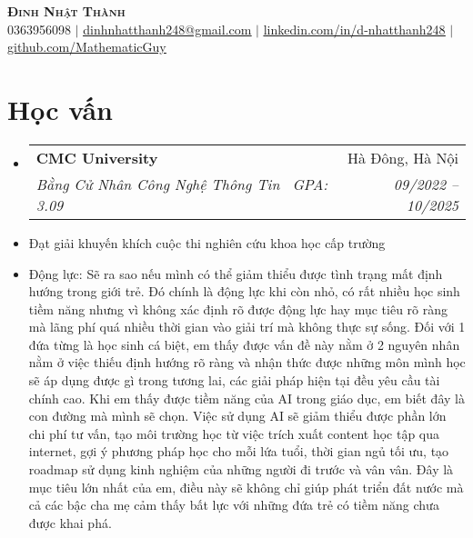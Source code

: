 \documentclass[letterpaper,11pt]{article}
\makeatletter
\newcommand{\resumeItem}[1]{
	\item\small{
	{#1 \vspace{-2pt}}
	}
}
\newcommand{\resumeSubheading}[4]{
	\vspace{-2pt}\item
	\begin{tabular*}{0.97\textwidth}[t]{l@{\extracolsep{\fill}}r}
		\textbf{#1} & #2 \\
		\textit{\small#3} & \textit{\small #4} \\
	\end{tabular*}\vspace{-7pt}
}
\newcommand{\resumeSubHeadingListStart}{\begin{itemize}[leftmargin=0.15in, label={}]}
\newcommand{\resumeSubHeadingListEnd}{\end{itemize}}
\makeatother
\begin{document}

\begin{center}
    \textbf{\Huge \scshape Đinh Nhật Thành} \\ \vspace{1pt}
    \small 0363956098 $|$ \href{mailto:x@x.com}{\underline{dinhnhatthanh248@gmail.com}} $|$
    \href{https://linkedin.com/in/...}{\underline{linkedin.com/in/d-nhatthanh248}} $|$
    \href{https://github.com/...}{\underline{github.com/MathematicGuy}}
\end{center}


\section{Học vấn}
	\resumeSubHeadingListStart
	\resumeSubheading
		{CMC University} {Hà Đông, Hà Nội}
		{Bằng Cử Nhân Công Nghệ Thông Tin \textbar \ GPA: 3.09}{09/2022 -- 10/2025}
		\resumeItem{Đạt giải khuyến khích cuộc thi nghiên cứu khoa học cấp trường}
		\resumeItem{Động lực: 	Sẽ ra sao nếu mình có thể giảm thiểu được tình trạng mất định hướng trong giới trẻ. Đó chính là động lực khi còn nhỏ, có rất nhiều học sinh tiềm năng nhưng vì không xác định rõ được động lực hay mục tiêu rõ ràng mà lãng phí quá nhiều thời gian vào giải trí mà không thực sự sống. Đối với 1 đứa từng là học sinh cá biệt, em thấy được vấn đề này nằm ở 2 nguyên nhân nằm ở việc thiếu định hướng rõ ràng và nhận thức được những môn mình học sẽ áp dụng được gì trong tương lai, các giải pháp hiện tại đều yêu cầu tài chính cao. Khi em thấy được tiềm năng của AI trong giáo dục, em biết đây là con đường mà mình sẽ chọn. Việc sử dụng AI sẽ giảm thiểu được phần lớn chi phí tư vấn, tạo môi trường học từ việc trích xuất content học tập qua internet, gợi ý phương pháp học cho mỗi lứa tuổi, thời gian ngủ tối ưu, tạo roadmap sử dụng kinh nghiệm của những người đi trước và vân vân. Đây là mục tiêu lớn nhất của em, điều này sẽ không chỉ giúp phát triển đất nước mà cả các bậc cha mẹ cảm thấy bất lực với những đứa trẻ có tiềm năng chưa được khai phá.}
	\resumeSubHeadingListEnd
\end{document}
